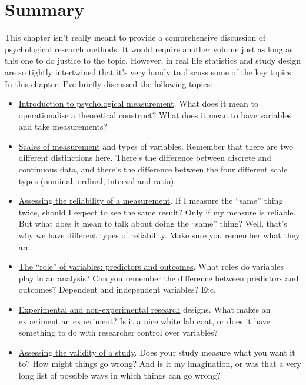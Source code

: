 \documentclass[
  letterpaper,
]{book}
\providecommand{\tightlist}{%
  \setlength{\itemsep}{0pt}\setlength{\parskip}{0pt}}\usepackage{longtable,booktabs,array}
\begin{document}
\hypertarget{summary}{%
\section{Summary}\label{summary}}

This chapter isn't really meant to provide a comprehensive discussion of
psychological research methods. It would require another volume just as
long as this one to do justice to the topic. However, in real life
statistics and study design are so tightly intertwined that it's very
handy to discuss some of the key topics. In this chapter, I've briefly
discussed the following topics:

\begin{itemize}
\tightlist
\item
  \protect\hyperlink{sec-Introduction-to-psychological-measurement}{Introduction
  to psychological measurement}. What does it mean to operationalise a
  theoretical construct? What does it mean to have variables and take
  measurements?
\item
  \protect\hyperlink{sec-Scales-of-measurement}{Scales of measurement}
  and types of variables. Remember that there are two different
  distinctions here. There's the difference between discrete and
  continuous data, and there's the difference between the four different
  scale types (nominal, ordinal, interval and ratio).
\item
  \protect\hyperlink{sec-Assessing-the-reliability-of-a-measurement}{Assessing
  the reliability of a measurement}. If I measure the ``same'' thing
  twice, should I expect to see the same result? Only if my measure is
  reliable. But what does it mean to talk about doing the ``same''
  thing? Well, that's why we have different types of reliability. Make
  sure you remember what they are.
\item
  \protect\hyperlink{the-role-of-variables-predictors-and-outcomes}{The
  ``role'' of variables: predictors and outcomes}. What roles do
  variables play in an analysis? Can you remember the difference between
  predictors and outcomes? Dependent and independent variables? Etc.
\item
  \protect\hyperlink{experimental-and-non-experimental-research}{Experimental
  and non-experimental research} designs. What makes an experiment an
  experiment? Is it a nice white lab coat, or does it have something to
  do with researcher control over variables?
\item
  \protect\hyperlink{assessing-the-validity-of-a-study}{Assessing the
  validity of a study}. Does your study measure what you want it to? How
  might things go wrong? And is it my imagination, or was that a very
  long list of possible ways in which things can go wrong?
\end{itemize}
\end{document}
